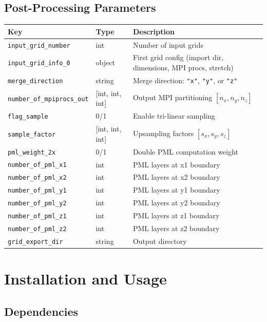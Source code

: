 \documentclass[11pt,a4paper]{report}
\begin{document}
\section{Post-Processing Parameters}

\begin{longtable}{p{5.5cm} p{2cm} p{7cm}}
\toprule
\textbf{Key} & \textbf{Type} & \textbf{Description} \\
\midrule
\texttt{input\_grid\_number} & int & Number of input grids \\
\texttt{input\_grid\_info\_0} & object & First grid config (import dir, dimensions, MPI procs, stretch) \\
\texttt{merge\_direction} & string & Merge direction: \texttt{"x"}, \texttt{"y"}, or \texttt{"z"} \\
\texttt{number\_of\_mpiprocs\_out} & [int, int, int] & Output MPI partitioning $[n_x, n_y, n_z]$ \\
\texttt{flag\_sample} & 0/1 & Enable tri-linear sampling \\
\texttt{sample\_factor} & [int, int, int] & Upsampling factors $[s_x, s_y, s_z]$ \\
\texttt{pml\_weight\_2x} & 0/1 & Double PML computation weight \\
\texttt{number\_of\_pml\_x1} & int & PML layers at x1 boundary \\
\texttt{number\_of\_pml\_x2} & int & PML layers at x2 boundary \\
\texttt{number\_of\_pml\_y1} & int & PML layers at y1 boundary \\
\texttt{number\_of\_pml\_y2} & int & PML layers at y2 boundary \\
\texttt{number\_of\_pml\_z1} & int & PML layers at z1 boundary \\
\texttt{number\_of\_pml\_z2} & int & PML layers at z2 boundary \\
\texttt{grid\_export\_dir} & string & Output directory \\
\bottomrule
\end{longtable}

\chapter{Installation and Usage}

\section{Dependencies}
\end{document}
